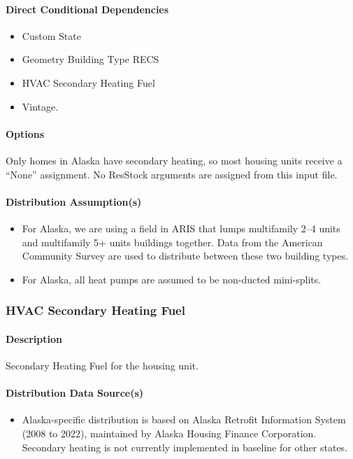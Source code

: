\paragraph{Direct Conditional Dependencies}
\begin{itemize}
    \item Custom State
    \item Geometry Building Type RECS
    \item HVAC Secondary Heating Fuel
    \item Vintage.
\end{itemize}
\paragraph{Options}
Only homes in Alaska have secondary heating, so most housing units receive a ``None'' assignment. No ResStock arguments are assigned from this input file. 

\paragraph{Distribution Assumption(s)}
\begin{itemize}
    \item For Alaska, we are using a field in ARIS that lumps multifamily 2--4 units and multifamily 5+ units buildings together. Data from the American Community Survey are used to distribute between these two building types.
    \item For Alaska, all heat pumps are assumed to be non-ducted mini-splits.
\end{itemize}

\subsubsection{HVAC Secondary Heating Fuel}
\paragraph{Description}
Secondary Heating Fuel for the housing unit. 
\paragraph{Distribution Data Source(s)}
\begin{itemize}
\item Alaska-specific distribution is based on Alaska Retrofit Information System (2008 to 2022), maintained by Alaska Housing Finance Corporation. Secondary heating is not currently implemented in baseline for other states.
\end{itemize}
